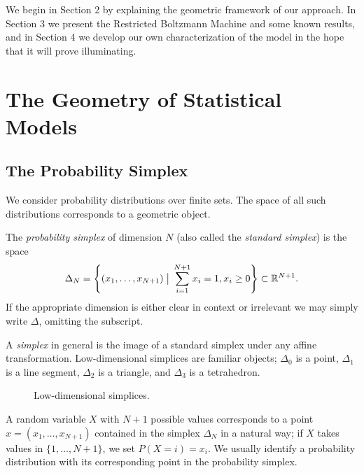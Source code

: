 \documentclass[cclicense]{hmcthesis}
\newcommand*{\vbar}{\;\big\vert\;}
\numberwithin{equation}{section}
\begin{document}
    We begin in Section 2 by explaining the geometric framework of our approach.
    In Section 3 we present the Restricted Boltzmann Machine and some known
    results, and in Section 4 we develop our own characterization of the model
    in the hope that it will prove illuminating.

\chapter{The Geometry of Statistical Models}
    \section{The Probability Simplex}

    We consider probability distributions over finite sets.  The space of all
    such distributions corresponds to a geometric object.
    
    \begin{definition} 
        The \emph{probability simplex} of dimension $N$ (also
        called the \emph{standard simplex}) is the space
        \[
            \Delta_N = 
            \left\{(x_1, \ldots, x_{N+1}) \vbar \sum_{i=1}^{N+1} x_i= 1, x_i \ge 0 \right\} 
            \subset
            \R^{N+1}.
        \]
        If the appropriate dimension is either clear in context or irrelevant we
        may simply write $\Delta$, omitting the subscript.
    \end{definition}
    A \emph{simplex} in general is the image of a standard simplex under any
    affine transformation.  Low-dimensional simplices are familiar objects;
    $\Delta_0$ is a point, $\Delta_1$ is a line segment, $\Delta_2$ is a
    triangle, and $\Delta_3$ is a tetrahedron.
    \begin{figure}[H]
        \centering
        \caption{Low-dimensional simplices.}
    \end{figure}
    \noindent A random variable $X$ with $N+1$ possible values corresponds to a point $x =
    (x_1, \ldots, x_{N+1})$ contained in the simplex $\Delta_N$ in a natural
    way; if $X$ takes values in $\{1, \ldots, N+1\}$, we set $P(X = i) = x_i$.
    We usually identify a probability distribution with its corresponding
    point in the probability simplex.  
    
\end{document}
